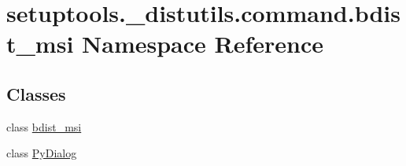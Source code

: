 \hypertarget{namespacesetuptools_1_1__distutils_1_1command_1_1bdist__msi}{}\section{setuptools.\+\_\+distutils.\+command.\+bdist\+\_\+msi Namespace Reference}
\label{namespacesetuptools_1_1__distutils_1_1command_1_1bdist__msi}
\subsection*{Classes}
\begin{DoxyCompactItemize}
\item 
class \hyperlink{classsetuptools_1_1__distutils_1_1command_1_1bdist__msi_1_1bdist__msi}{bdist\+\_\+msi}
\item 
class \hyperlink{classsetuptools_1_1__distutils_1_1command_1_1bdist__msi_1_1PyDialog}{Py\+Dialog}
\end{DoxyCompactItemize}
